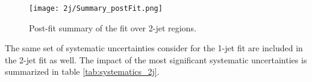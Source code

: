 \begin{figure}[H]
    \center
    \texttt{[image: 2j/Summary\_postFit.png]}
    \caption{Post-fit summary of the fit over 2-jet regions.}
    \label{fig:fit_results_2j}
\end{figure}


The same set of systematic uncertainties consider for the 1-jet fit are included in the 2-jet fit as well. The impact of the most significant systematic uncertainties is summarized in table \ref{tab:systematics_2j}. 

